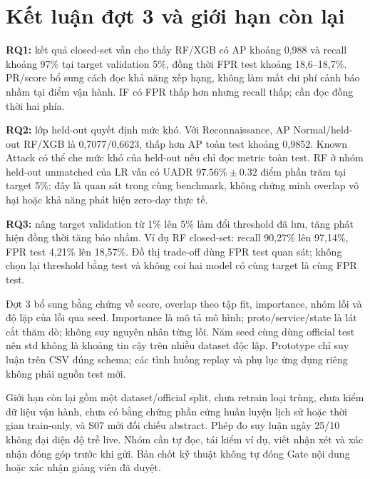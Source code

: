 \section{Kết luận đợt 3 và giới hạn còn lại}
\textbf{RQ1:} kết quả closed-set vẫn cho thấy RF/XGB có AP khoảng 0,988 và recall khoảng 97\% tại target validation 5\%, đồng thời FPR test khoảng 18,6--18,7\%. PR/score bổ sung cách đọc khả năng xếp hạng, không làm mất chi phí cảnh báo nhầm tại điểm vận hành. IF có FPR thấp hơn nhưng recall thấp; cần đọc đồng thời hai phía.

\textbf{RQ2:} lớp held-out quyết định mức khó. Với Reconnaissance, AP Normal/held-out RF/XGB là 0,7077/0,6623, thấp hơn AP toàn test khoảng 0,9852. Known Attack có thể che mức khó của held-out nếu chỉ đọc metric toàn test. RF ở nhóm held-out unmatched của LR vẫn có UADR $97.56\%\pm0.32$ điểm phần trăm tại target 5\%; đây là quan sát trong cùng benchmark, không chứng minh overlap vô hại hoặc khả năng phát hiện zero-day thực tế.

\textbf{RQ3:} nâng target validation từ 1\% lên 5\% làm đổi threshold đã lưu, tăng phát hiện đồng thời tăng báo nhầm. Ví dụ RF closed-set: recall 90,27\% lên 97,14\%, FPR test 4,21\% lên 18,57\%. Đồ thị trade-off dùng FPR test quan sát; không chọn lại threshold bằng test và không coi hai model có cùng target là cùng FPR test.

Đợt 3 bổ sung bằng chứng về score, overlap theo tập fit, importance, nhóm lỗi và độ lặp của lỗi qua seed. Importance là mô tả mô hình; proto/service/state là lát cắt thăm dò; không suy nguyên nhân từng lỗi. Năm seed cùng dùng official test nên std không là khoảng tin cậy trên nhiều dataset độc lập. Prototype chỉ suy luận trên CSV đúng schema; các tình huống replay và phụ lục ứng dụng riêng không phải nguồn test mới.

Giới hạn còn lại gồm một dataset/official split, chưa retrain loại trùng, chưa kiểm dữ liệu vận hành, chưa có bằng chứng phần cứng huấn luyện lịch sử hoặc thời gian train-only, và S07 mới đối chiếu abstract. Phép đo suy luận ngày 25/10 không đại diện độ trễ live. Nhóm cần tự đọc, tái kiểm ví dụ, viết nhận xét và xác nhận đóng góp trước khi gửi. Bản chốt kỹ thuật không tự đóng Gate nội dung hoặc xác nhận giảng viên đã duyệt.

